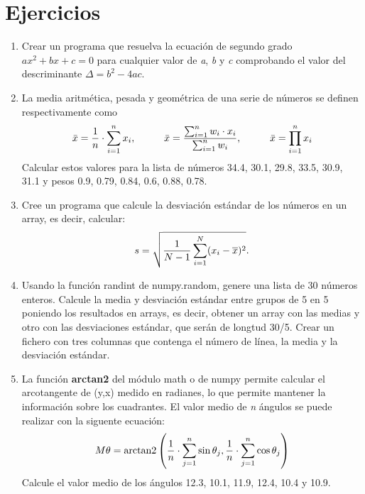 \documentclass[letterpaper,10pt,spanish]{sphinxmanual}
\begin{document}
\section{Ejercicios}
\label{numpy:ejercicios}\begin{enumerate}
\item {} 
Crear un programa que resuelva la ecuación de segundo grado $ax^2 + bx + c = 0$ para cualquier valor de \emph{a}, \emph{b} y \emph{c} comprobando el valor del descriminante $\Delta = b^2 - 4ac$.

\item {} 
La media aritmética, pesada y geométrica de una serie de números se definen respectivamente como
\begin{gather}
\begin{split}\bar{x} = \frac{1}{n}\cdot \sum_{i=1}^n{x_i}, \hspace{1cm} \bar{x} = \frac{\sum_{i=1}^n{w_i \cdot x_i}}{\sum_{i=1}^n {w_i}}, \hspace{1cm} \bar{x} =  \prod_{i=1}^n{x_i}\end{split}\notag
\end{gather}
Calcular estos valores para la lista de números 34.4, 30.1, 29.8, 33.5, 30.9, 31.1 y pesos 0.9, 0.79, 0.84, 0.6, 0.88, 0.78.

\item {} 
Cree un programa que calcule la desviación estándar de los números en un array, es decir, calcular:
\begin{gather}
\begin{split}s = \sqrt{\frac{1}{N-1} \sum_{i=1}^N (x_i - \overline{x})^2}.\end{split}\notag
\end{gather}
\item {} 
Usando la función randint de numpy.random, genere una lista de 30 números enteros. Calcule la media y desviación estándar entre grupos de 5 en 5 poniendo los resultados en arrays, es decir, obtener un array con las medias y otro con las desviaciones estándar, que serán de longtud 30/5. Crear un fichero con tres columnas que contenga el número de línea, la media y la desviación estándar.

\item {} 
La función \textbf{arctan2} del módulo math o de numpy permite calcular el arcotangente de (y,x) medido en radianes, lo que permite mantener la información sobre los cuadrantes. El valor medio de \emph{n} ángulos se puede realizar con la siguente ecuación:
\begin{gather}
\begin{split}M \theta = \operatorname{arctan2}\left(\frac{1}{n}\cdot\sum_{j=1}^n \sin\theta_j, \frac{1}{n}\cdot\sum_{j=1}^n \cos\theta_j\right)\end{split}\notag
\end{gather}
Calcule el valor medio de los ángulos 12.3, 10.1, 11.9, 12.4, 10.4 y 10.9.


\end{enumerate}
\end{document}
